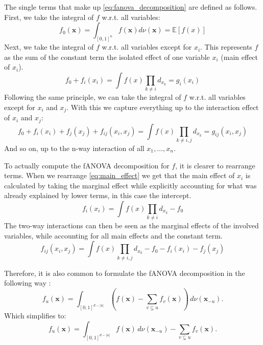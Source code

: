 The single terms that make up \autoref{eq:fanova_decomposition} are defined as follows.
First, we take the integral of $f$ w.r.t. all variables:
\begin{equation}
    f_{0}(\mathbf{x}) = \int_{[0, 1]^n} f(\mathbf{x}) d\nu(\mathbf{x}) = \mathbb{E}[f(x)]
    \label{eq:intercapt}
\end{equation}
Next, we take the integral of $f$ w.r.t. all variables except for $x_i$. This represents $f$ as the sum of the constant term the isolated effect of one variable $x_i$ (main effect of $x_i$).
\begin{equation}
    f_0 + f_i(x_i) = \int f(x) \prod_{k \neq i} d_{x_{k}} = g_i(x_i)
    \label{eq:main_effect}
\end{equation}
Following the same principle, we can take the integral of $f$ w.r.t. all variables except for $x_i$ and $x_j$. With this we capture everything up to the interaction effect of $x_i$ and $x_j$:
\begin{equation}
    f_0 + f_i(x_i) + f_j(x_j) + f_{ij}(x_i,x_j) = \int f(x) \prod_{k \neq i,j} d_{x_{k}} = g_{ij}(x_i, x_j)
    \label{eq:interaction_effects}
\end{equation}
And so on, up to the n-way interaction of all $x_1, \dots, x_n$.\par

To actually compute the fANOVA decomposition for $f$, it is clearer to rearrange terms. When we rearrange \autoref{eq:main_effect} we get that the main effect of $x_i$ is calculated by taking the marginal effect while explicitly accounting for what was already explained by lower terms, in this case the intercept. 
\begin{equation}
    f_i(x_i) = \int f(x) \prod_{k \neq i} d_{x_{k}} - f_0
    \label{eq:main_effect_rearranged}
\end{equation}
The two-way interactions can then be seen as the marginal effects of the involved variables, while accounting for all main effects and the constant term. 
\begin{equation}
    f_{ij}(x_i,x_j) = \int f(x) \prod_{k \neq i,j} d_{x_{k}} - f_0 - f_i(x_i) - f_j(x_j) 
    \label{eq:interaction_effects}
\end{equation}

Therefore, it is also common to formulate the fANOVA decomposition in the following way \citep{hooker_generalized_2007,hooker_discovering_2004}:
\begin{equation}
    f_u(\mathbf{x}) = \int_{[0,1]^{d - |u|}} \left( f(\mathbf{x}) - \sum_{v \subsetneq u} f_v(\mathbf{x}) \right) \, d\nu(\mathbf{x}_{-u}).
\end{equation}
Which simplifies to:
\begin{equation}
    f_u(\mathbf{x}) = \int_{[0,1]^{d - |u|}} f(\mathbf{x}) \, d\nu(\mathbf{x}_{-u}) - \sum_{v \subsetneq u} f_v(\mathbf{x}).
\end{equation}

